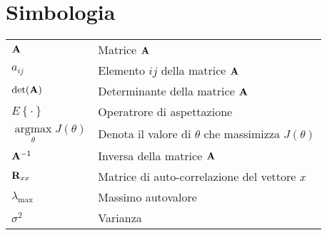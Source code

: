 
\chapter*{Simbologia}
\label{ref:simbologia}



\begin{tabular}{ll}
${\bf{A}}$ & Matrice ${\bf{A}}$  \\ 
$a_{ij}$ & Elemento $ij$ della matrice ${\bf{A}}$  \\ 
$\det({\bf{A}})$ & Determinante della matrice ${\bf{A}}$  \\ 
$E\left\{\cdot\right\}$ & Operatrore di aspettazione   \\ 
$\mathop {\arg \max }\limits_\theta  J\left( \theta  \right)$ & Denota il valore di $\theta$ che massimizza $J(\theta)$  \\
${\bf{A}}^{-1}$ & Inversa della matrice ${\bf{A}}$  \\
${\bf{R}}_{xx}$ & Matrice di auto-correlazione del vettore $x$ \\
$\lambda_{\max}$ & Massimo autovalore  \\
$\sigma^2$ & Varianza  \\
\end{tabular}





